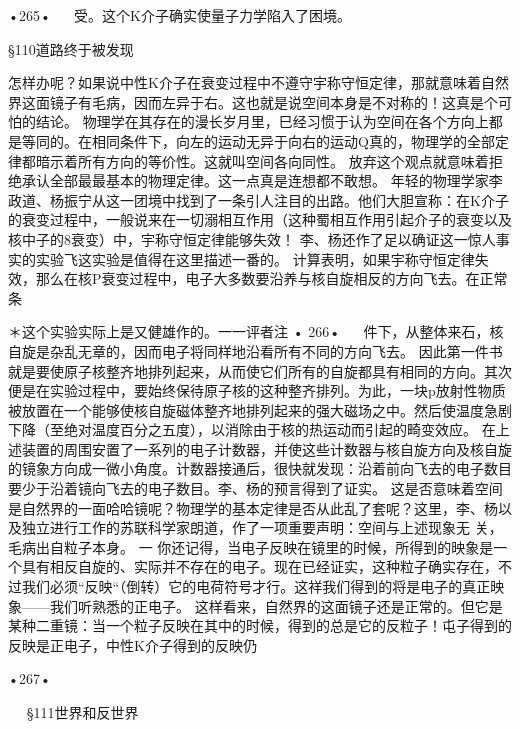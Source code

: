 •265•
  
受。这个K介子确实使量子力学陷入了困境。

§110道路终于被发现

怎样办呢？如果说中性K介子在衰变过程中不遵守宇称守恒定律，那就意味着自然界这面镜子有毛病，因而左异于右。这也就是说空间本身是不对称的！这真是个可怕的结论。
物理学在其存在的漫长岁月里，巳经习惯于认为空间在各个方向上都是等同的。在相同条件下，向左的运动无异于向右的运动Q真的，物理学的全部定律都暗示着所有方向的等价性。这就叫空间各向同性。
放弃这个观点就意味着拒绝承认全部最最基本的物理定律。这一点真是连想都不敢想。
年轻的物理学家李政道、杨振宁从这一团境中找到了一条引人注目的出路。他们大胆宣称：在K介子的衰变过程中，一般说来在一切溺相互作用（这种蜀相互作用引起介子的衰变以及核中子的8衰变）中，宇称守恒定律能够失效！
李、杨还作了足以确证这一惊人事实的实验飞这实验是值得在这里描述一番的。
计算表明，如果宇称守恒定律失效，那么在核P衰变过程中，电子大多数要沿养与核自旋相反的方向飞去。在正常条

＊这个实验实际上是又健雄作的。一一评者注
•	266•
  
件下，从整体来石，核自旋是杂乱无章的，因而电子将同样地沿看所有不同的方向飞去。
因此第一件书就是要使原子核整齐地排列起来，从而使它们所有的自旋都具有相同的方向。其次便是在实验过程中，要始终保待原子核的这种整齐排列。为此，一块p放射性物质被放置在一个能够使核自旋磁体整齐地排列起来的强大磁场之中。然后使温度急剧下降（至绝对温度百分之五度），以消除由于核的热运动而引起的畸变效应。
在上述装置的周围安置了一系列的电子计数器，并使这些计数器与核自旋方向及核自旋的镜象方向成一微小角度。计数器接通后，很快就发现：沿着前向飞去的电子数目要少于沿着镜向飞去的电子数目。李、杨的预言得到了证实。
这是否意味着空间是自然界的一面哈哈镜呢？物理学的基本定律是否从此乱了套呢？这里，李、杨以及独立进行工作的苏联科学家朗道，作了一项重要声明：空间与上述现象无
	关，毛病出自粒子本身。	一
你还记得，当电子反映在镜里的时候，所得到的映象是一个具有相反自旋的、实际并不存在的电子。现在已经证实，这种粒子确实存在，不过我们必须“反映“（倒转）它的电荷符号才行。这祥我们得到的将是电子的真正映象——我们听熟悉的正电子。
这样看来，自然界的这面镜子还是正常的。但它是某种二重镜：当一个粒子反映在其中的时候，得到的总是它的反粒子！屯子得到的反映是正电子，中性K介子得到的反映仍

•267•
  






  
§111世界和反世界

